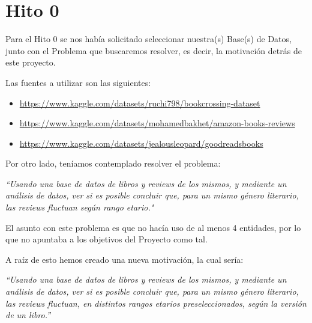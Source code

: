 \section{Hito 0}

Para el Hito 0 se nos había solicitado seleccionar nuestra(s) Base(s) de Datos, junto con el Problema que buscaremos resolver, es decir, la motivación detrás de este proyecto. \newline

Las fuentes a utilizar son las siguientes:

\begin{itemize}
    \item \hyperlink{https://www.kaggle.com/datasets/ruchi798/bookcrossing-dataset}{https://www.kaggle.com/datasets/ruchi798/bookcrossing-dataset}
    \item \hyperlink{https://www.kaggle.com/datasets/mohamedbakhet/amazon-books-reviews}{https://www.kaggle.com/datasets/mohamedbakhet/amazon-books-reviews}
    \item \hyperlink{https://www.kaggle.com/datasets/jealousleopard/goodreadsbooks}{https://www.kaggle.com/datasets/jealousleopard/goodreadsbooks}
\end{itemize}

Por otro lado, teníamos contemplado resolver el problema: \newline

\textit{``Usando una base de datos de libros y reviews de los mismos, y mediante un análisis de datos, ver si es posible concluir que, para un mismo género literario, las reviews fluctuan según rango etario."} \newline

El asunto con este problema es que no hacía uso de al menos 4 entidades, por lo que no apuntaba a los objetivos del Proyecto como tal. \newline

A raíz de esto hemos creado una nueva motivación, la cual sería: \newline

\textit{``Usando una base de datos de libros y reviews de los mismos, y mediante un análisis de datos, ver si es posible concluir que, para un mismo género literario, las reviews fluctuan, en distintos rangos etarios preseleccionados, según la versión de un libro.''}